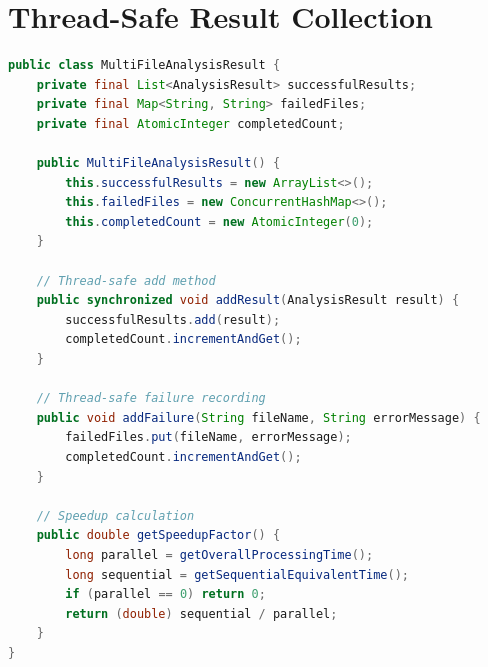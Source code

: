 \documentclass[12pt,a4paper]{report}
\begin{document}
\section{Thread-Safe Result Collection}
\begin{lstlisting}[language=Java, caption=Thread-Safe MultiFileAnalysisResult]
public class MultiFileAnalysisResult {
    private final List<AnalysisResult> successfulResults;
    private final Map<String, String> failedFiles;
    private final AtomicInteger completedCount;
    
    public MultiFileAnalysisResult() {
        this.successfulResults = new ArrayList<>();
        this.failedFiles = new ConcurrentHashMap<>();
        this.completedCount = new AtomicInteger(0);
    }
    
    // Thread-safe add method
    public synchronized void addResult(AnalysisResult result) {
        successfulResults.add(result);
        completedCount.incrementAndGet();
    }
    
    // Thread-safe failure recording
    public void addFailure(String fileName, String errorMessage) {
        failedFiles.put(fileName, errorMessage);
        completedCount.incrementAndGet();
    }
    
    // Speedup calculation
    public double getSpeedupFactor() {
        long parallel = getOverallProcessingTime();
        long sequential = getSequentialEquivalentTime();
        if (parallel == 0) return 0;
        return (double) sequential / parallel;
    }
}
\end{lstlisting}
\end{document}
